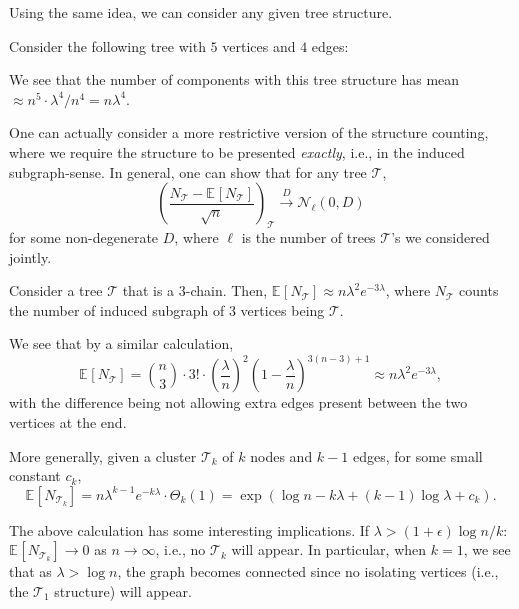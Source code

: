Using the same idea, we can consider any given tree structure.

\begin{intuition}
	Consider the following tree with \(5\) vertices and \(4\) edges:
	\begin{center}
	\end{center}
	We see that the number of components with this tree structure has mean \(\approx n^5 \cdot \lambda ^4 / n^4 = n \lambda ^4\).
\end{intuition}

One can actually consider a more restrictive version of the structure counting, where we require the structure to be presented \emph{exactly}, i.e., in the induced subgraph-sense. In general, one can show that for any tree \(\mathcal{T} \),
\[
	\left( \frac{N_{\mathcal{T} } - \mathbb{E}_{}[N_{\mathcal{T} }] }{\sqrt{n} } \right) _{\mathcal{T} }
	\overset{D}{\to} \mathcal{N} _\ell (0, D)
\]
for some non-degenerate \(D\), where \(\ell \) is the number of trees \(\mathcal{T} \)'s we considered jointly.

\begin{eg}
	Consider a tree \(\mathcal{T} \) that is a \(3\)-chain. Then, \(\mathbb{E}_{}[N_{\mathcal{T} }] \approx n \lambda ^2 e^{-3\lambda }\), where \(N_{\mathcal{T} } \) counts the number of induced subgraph of \(3\) vertices being \(\mathcal{T} \).
	\begin{center}
	\end{center}
\end{eg}
\begin{explanation}
	We see that by a similar calculation,
	\[
		\mathbb{E}_{}[N_{\mathcal{T} } ]
		= \binom{n}{3} \cdot 3! \cdot \left( \frac{\lambda }{n} \right) ^{2} \left( 1 - \frac{\lambda}{n} \right) ^{3(n-3) + 1}
		\approx n \lambda ^2 e^{-3\lambda },
	\]
	with the difference being not allowing extra edges present between the two vertices at the end.
\end{explanation}

\begin{eg}
	More generally, given a cluster \(\mathcal{T} _k\) of \(k\) nodes and \(k-1\) edges, for some small constant \(c_k\),
	\[
		\mathbb{E}_{}[N_{\mathcal{T} _k} ]
		= n \lambda ^{k-1} e^{-k \lambda } \cdot \Theta _{k} (1)
		= \exp (\log n - k \lambda + (k-1) \log \lambda + c_k).
	\]
\end{eg}

The above calculation has some interesting implications. If \(\lambda > (1 + \epsilon ) \log n / k\): \(\mathbb{E}_{}[N_{\mathcal{T} _k}] \to 0\) as \(n \to \infty \), i.e., no \(\mathcal{T} _k\) will appear. In particular, when \(k = 1\), we see that as \(\lambda > \log n\), the graph becomes connected since no isolating vertices (i.e., the \(\mathcal{T} _1\) structure) will appear.

